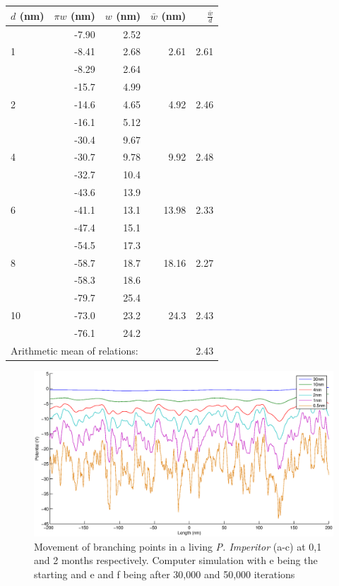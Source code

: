 \message{ !name(report.tex)}\documentclass[]{article}
\begin{document}
\begin{center}
  \begin{tabular}{| l | r | r | r | r |}
    \hline
    $d$ (nm) & $\pi w$ (nm)  & $w$ (nm) & $\bar{w}$ (nm) & $\frac{\bar{w}}{d}$ \\ \hline
    \multirow{3}{*}{1} & -7.90 &  2.52 & \multirow{3}{*}{2.61} & \multirow{3}{*}{2.61} \\ 
    & -8.41 &  2.68 & & \\ 
    & -8.29 &  2.64 & & \\ \hline
    \multirow{3}{*}{2} & -15.7 &  4.99 & \multirow{3}{*}{4.92} & \multirow{3}{*}{2.46} \\ 
    & -14.6 &  4.65 & & \\ 
    & -16.1 &  5.12 & & \\ \hline
    \multirow{3}{*}{4} & -30.4 &  9.67 & \multirow{3}{*}{9.92} & \multirow{3}{*}{2.48} \\ 
    & -30.7 &  9.78 & & \\ 
    & -32.7 &  10.4 & & \\ \hline
    \multirow{3}{*}{6} & -43.6 &  13.9 & \multirow{3}{*}{13.98} & \multirow{3}{*}{2.33} \\ 
    & -41.1 &  13.1 & & \\ 
    & -47.4 &  15.1 & & \\ \hline
    \multirow{3}{*}{8} & -54.5 &  17.3 & \multirow{3}{*}{18.16} & \multirow{3}{*}{2.27} \\ 
    & -58.7 &  18.7 & & \\ 
    & -58.3 &  18.6 & & \\ \hline
    \multirow{3}{*}{10} & -79.7 &  25.4 & \multirow{3}{*}{24.3} & \multirow{3}{*}{2.43} \\ 
    & -73.0 &  23.2 & & \\ 
    & -76.1 &  24.2 & & \\ \hline \hline
    \multicolumn{4}{|l|}{Arithmetic mean of relations:} & 2.43 \\ 
    \hline
  \end{tabular}
\end{center}


\begin{figure}
\centering
\includegraphics[width=\textwidth]{potentials.eps}
\caption{Movement of branching points in a living \emph{P. Imperitor} (a-c) at 0,1 and 2 months respectively.
Computer simulation with e being the starting and e and f being after 30,000 and 50,000 iterations \label{branching}}
\end{figure}
\end{document}
